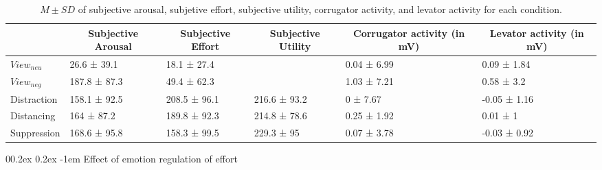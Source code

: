 \documentclass[
  man,floatsintext]{apa6}
\makeatletter
\let\oldparagraph\paragraph
\renewcommand{\paragraph}[1]{\oldparagraph{#1}\mbox{}}
\renewcommand{\paragraph}{\@startsection{paragraph}{4}{\parindent}%
  {0\baselineskip \@plus 0.2ex \@minus 0.2ex}%
  {-1em}%
  {\normalfont\normalsize\bfseries\itshape\typesectitle}}
\makeatother
\begin{document}
\begin{table}[H]

\begin{center}
\begin{threeparttable}

\caption{\label{tab:TabDescr}$M \pm SD$ of subjective arousal, subjetive effort, subjective utility, corrugator activity, and levator activity for each condition.}

\begin{tabular}{p{2.5cm}p{2.5cm}p{2.5cm}p{2.5cm}p{2.5cm}p{2.5cm}}
\toprule
 & \multicolumn{1}{c}{Subjective Arousal} & \multicolumn{1}{c}{Subjective Effort} & \multicolumn{1}{c}{Subjective Utility} & \multicolumn{1}{c}{Corrugator activity (in mV)} & \multicolumn{1}{c}{Levator activity (in mV)}\\
\midrule
$View_{neu}$ & 26.6 ± 39.1 & 18.1 ± 27.4 &  & 0.04 ± 6.99 & 0.09 ± 1.84\\
$View_{neg}$ & 187.8 ± 87.3 & 49.4 ± 62.3 &  & 1.03 ± 7.21 & 0.58 ± 3.2\\
Distraction & 158.1 ± 92.5 & 208.5 ± 96.1 & 216.6 ± 93.2 & 0 ± 7.67 & -0.05 ± 1.16\\
Distancing & 164 ± 87.2 & 189.8 ± 92.3 & 214.8 ± 78.6 & 0.25 ± 1.92 & 0.01 ± 1\\
Suppression & 168.6 ± 95.8 & 158.3 ± 99.5 & 229.3 ± 95 & 0.07 ± 3.78 & -0.03 ± 0.92\\
\bottomrule
\end{tabular}

\end{threeparttable}
\end{center}

\end{table}

\hypertarget{effect-of-emotion-regulation-of-effort}{%
\paragraph{Effect of emotion regulation of effort}\label{effect-of-emotion-regulation-of-effort}}
\end{document}
